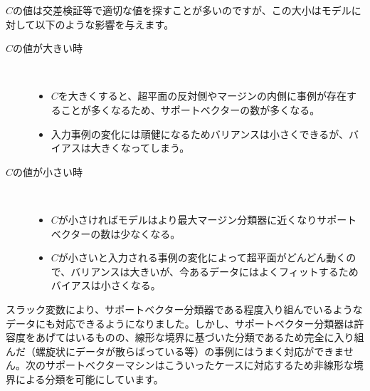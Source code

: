 \documentclass[uplatex]{jsarticle}
\begin{document}
$C$の値は交差検証等で適切な値を探すことが多いのですが、この大小はモデルに対して以下のような影響を与えます。
\begin{description}
  \item[$C$の値が大きい時]\mbox{}\\
  \begin{itemize}
    \item $C$を大きくすると、超平面の反対側やマージンの内側に事例が存在することが多くなるため、サポートベクターの数が多くなる。
    \item 入力事例の変化には頑健になるためバリアンスは小さくできるが、バイアスは大きくなってしまう。
  \end{itemize}
  \item[$C$の値が小さい時]\mbox{}\\
  \begin{itemize}
    \item $C$が小さければモデルはより最大マージン分類器に近くなりサポートベクターの数は少なくなる。
    \item $C$が小さいと入力される事例の変化によって超平面がどんどん動くので、バリアンスは大きいが、今あるデータにはよくフィットするためバイアスは小さくなる。
  \end{itemize}
\end{description}

スラック変数により、サポートベクター分類器である程度入り組んでいるようなデータにも対応できるようになりました。しかし、サポートベクター分類器は許容度をあげてはいるものの、線形な境界に基づいた分類であるため完全に入り組んだ（螺旋状にデータが散らばっている等）の事例にはうまく対応ができません。次のサポートベクターマシンはこういったケースに対応するため非線形な境界による分類を可能にしています。
\end{document}
